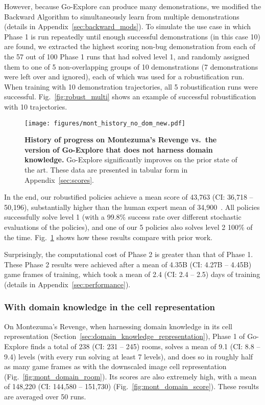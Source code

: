 \documentclass{article}
\newcommand{\pivotci}[2]{(CI: #1 -- #2)}  \newcommand{\percci}[2]{}  \newcommand{\tpivotci}[2]{(#1 -- #2)}  \newcommand{\tpercci}[2]{}  \newcommand{\na}[0]{-}
\begin{document}
However, because Go-Explore can produce many demonstrations, we modified the Backward Algorithm to simultaneously learn from multiple demonstrations (details in Appendix~\ref{sec:backward_mods}). To simulate the use case in which Phase 1 is run repeatedly until enough successful demonstrations (in this case 10) are found, we extracted the highest scoring non-bug demonstration from each of the 57 out of 100 Phase 1 runs that had solved level 1, and randomly assigned them to one of 5 non-overlapping groups of 10 demonstrations (7 demonstrations were left over and ignored), each of which was used for a robustification run. When training with 10 demonstration trajectories, all 5 robustification runs were successful. Fig.~\ref{fig:robust_multi} shows an example of successful robustification with 10 trajectories.

\begin{figure}
    \centering
    \texttt{[image: figures/mont\_history\_no\_dom\_new.pdf]}
    \caption{\textbf{History of progress on Montezuma's Revenge vs.\ the version of Go-Explore that does not harness domain knowledge.} Go-Explore significantly improves on the prior state of the art. These data are presented in tabular form in Appendix~\ref{sec:scores}.}
    \label{fig:mont_history_no_dom}
\end{figure}

In the end, our robustified policies achieve a mean score of 43,763 \pivotci{36,718}{50,196}\percci{37,379}{50,436}, substantially higher than the human expert mean of 34,900~\cite{pohlen2018observe}. All policies successfully solve level 1 (with a 99.8\% success rate over different stochastic evaluations of the policies), and one of our 5 policies also solves level 2 100\% of the time.
Fig.~\ref{fig:mont_history_no_dom} shows how these results compare with prior work.

Surprisingly, the computational cost of Phase 2 is greater than that of Phase 1. These Phase 2 results were achieved after a mean of 4.35B \pivotci{4.27B}{4.45B}\percci{4.25B}{4.43B} game frames of training, which took a mean of 2.4 \pivotci{2.4}{2.5}\percci{2.4}{2.5} days of training (details in Appendix~\ref{sec:performance}).

\subsubsection{With domain knowledge in the cell representation}
\label{sec:mr_domain_knowledge}

On Montezuma's Revenge, when harnessing domain knowledge in its cell representation (Section~\ref{sec:domain_knowledge_representation}), Phase 1 of Go-Explore finds a total of 238 \pivotci{231}{245}\percci{231}{245} rooms, solves a mean of 9.1 \pivotci{8.8}{9.4}\percci{8.8}{9.4} levels (with every run solving at least 7 levels), and does so in roughly half as many game frames as with the downscaled image cell representation (Fig.~\ref{fig:mont_domain_room}). Its scores are also extremely high, with a mean of 148,220 \pivotci{144,580}{151,730}\percci{144,756}{151,818} (Fig.~\ref{fig:mont_domain_score}). These results are averaged over 50 runs. 
\end{document}
